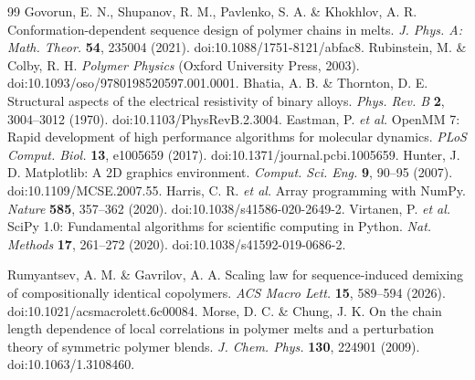 \documentclass[pdflatex,sn-nature,onecolumn]{sn-jnl}
\begin{document}
\begin{thebibliography}{99}
 Govorun, E. N., Shupanov, R. M., Pavlenko, S. A. \& Khokhlov, A. R. Conformation-dependent sequence design of polymer chains in melts. \textit{J. Phys. A: Math. Theor.} \textbf{54}, 235004 (2021). doi:10.1088/1751-8121/abfac8.
 Rubinstein, M. \& Colby, R. H. \textit{Polymer Physics} (Oxford University Press, 2003). doi:10.1093/oso/9780198520597.001.0001.
 Bhatia, A. B. \& Thornton, D. E. Structural aspects of the electrical resistivity of binary alloys. \textit{Phys. Rev. B} \textbf{2}, 3004--3012 (1970). doi:10.1103/PhysRevB.2.3004.
 Eastman, P. \textit{et al.} OpenMM 7: Rapid development of high performance algorithms for molecular dynamics. \textit{PLoS Comput. Biol.} \textbf{13}, e1005659 (2017). doi:10.1371/journal.pcbi.1005659.
 Hunter, J. D. Matplotlib: A 2D graphics environment. \textit{Comput. Sci. Eng.} \textbf{9}, 90--95 (2007). doi:10.1109/MCSE.2007.55.
 Harris, C. R. \textit{et al.} Array programming with NumPy. \textit{Nature} \textbf{585}, 357--362 (2020). doi:10.1038/s41586-020-2649-2.
 Virtanen, P. \textit{et al.} SciPy 1.0: Fundamental algorithms for scientific computing in Python. \textit{Nat. Methods} \textbf{17}, 261--272 (2020). doi:10.1038/s41592-019-0686-2.

 Rumyantsev, A. M. \& Gavrilov, A. A. Scaling law for sequence-induced demixing of compositionally identical copolymers. \textit{ACS Macro Lett.} \textbf{15}, 589--594 (2026). doi:10.1021/acsmacrolett.6c00084.
 Morse, D. C. \& Chung, J. K. On the chain length dependence of local correlations in polymer melts and a perturbation theory of symmetric polymer blends. \textit{J. Chem. Phys.} \textbf{130}, 224901 (2009). doi:10.1063/1.3108460.
\end{thebibliography}
\endgroup
\end{document}
